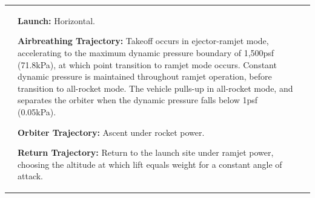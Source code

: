 {\begin{landscape}
\begin{xltabular}{\linewidth}{|X|X|X|}
	&\small
	
	
	\textbf{Launch:} Horizontal.
	
	\textbf{Airbreathing Trajectory:} Takeoff occurs in ejector-ramjet mode, accelerating to the maximum dynamic pressure boundary of 1,500psf (71.8kPa), at which point transition to ramjet mode occurs. Constant dynamic pressure is maintained throughout ramjet operation, before transition to all-rocket mode. The vehicle pulls-up in all-rocket mode, and separates the orbiter when the dynamic pressure falls below 1psf (0.05kPa).
	
	\textbf{Orbiter Trajectory:}  Ascent under rocket power.
	
	\textbf{Return Trajectory:} Return to the launch site under ramjet power, choosing the altitude at which lift equals weight for a constant angle of attack. 
	

\end{xltabular}
\end{landscape}}
